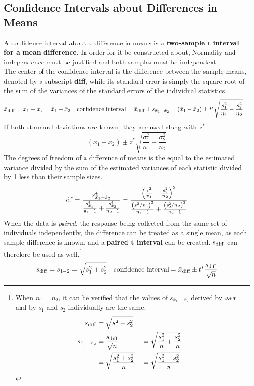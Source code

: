 \documentclass[../AP_Statistics.tex]{subfiles}
\begin{document}
			\subsection*{Confidence Intervals about Differences in Means}
				A confidence interval about a difference in means is a \textbf{two-sample $\bm{t}$ interval for a mean difference}. In order for it be constructed about, Normality and independence must be justified and both samples must be independent. \\
				The center of the confidence interval is the difference between the sample means, denoted by a subscript \textbf{diff}, while its standard error is simply the square root of the sum of the variances of the standard errors of the individual statistics.
				\begin{align*}
					\bar{x}_{\mathrm{diff}} &= \overline{x_1 - x_2} = \bar{x}_1 - \bar{x}_2 & 
					\text{confidence interval} &= \bar{x}_{\mathrm{diff}} \pm s_{\bar{x}_1 - \bar{x}_2} = (\bar{x}_1 - \bar{x}_2) \pm t^*\sqrt{\frac{s_1^2}{n_1} + \frac{s_2^2}{n_2}}
				\end{align*}
				If both standard deviations are known, they are used along with $z^*$.
				\[(\bar{x}_1 - \bar{x}_2) \pm z^*\sqrt{\frac{\sigma_1^2}{n_1} +\frac{\sigma_2^2}{n_2}}\]
				The degrees of freedom of a difference of means is the equal to the estimated variance divided by the sum of the estimated variances of each statistic divided by 1 less than their sample sizes.
				\[\operatorname{\mathrm{df}} = \frac{s_{\bar{x}_1 - \bar{x}_2}^4}{\frac{s_{\bar{x}_1}^4}{n_1 - 1} + \frac{s_{\bar{x}_2}^4}{n_2 - 1}} = \frac{\left(\frac{s_1^2}{n_1} + \frac{s_2^2}{n_2}\right)^2}{\frac{\left(s_1^2/n_1\right)^2}{n_1 - 1} + \frac{\left(s_2^2/n_2\right)^2}{n_2 - 1}}\]
				When the data is \emph{paired}, the response being collected from the same set of individuals independently, the difference can be treated as a single mean, as each sample difference is known, and a \textbf{paired $\bm{t}$ interval} can be created. $s_{\mathrm{diff}}$ can therefore be used as well.\footnote{
					When $n_1 = n_2$, it can be verified that the values of $s_{\bar{x}_1 - \bar{x}_2}$ derived by $s_{\mathrm{diff}}$ and by $s_1$ and $s_2$ individually are the same.
					\begin{align*}
						s_{\mathrm{diff}} &= \sqrt{s_1^2 + s_2^2} \\
						s_{\bar{x}_1 - \bar{x}_2} &= \frac{s_{\mathrm{diff}}}{\sqrt{n}} & &= \sqrt{\frac{s_1^2}{n} + \frac{s_2^2}{n}} \\
							&= \sqrt{\frac{s_1^2 + s_2^2}{n}} & &= \sqrt{\frac{s_1^2 + s_2^2}{n}}\\
					\end{align*}
					}
				\begin{align*}
					s_{\mathrm{diff}} &= s_{1 - 2} = \sqrt{s_1^2 + s_2^2} &\text{confidence interval} = \bar{x}_{\mathrm{diff}} \pm t^*\frac{s_{\mathrm{diff}}}{\sqrt{n}}
				\end{align*}
\end{document}
